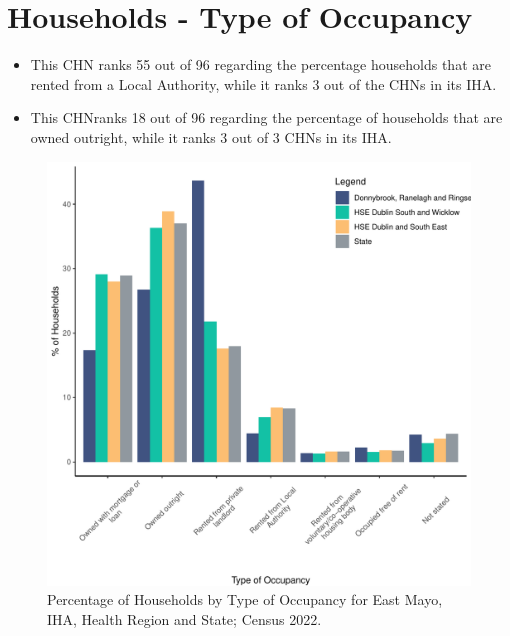 \documentclass{article}
\begin{document}
\section{Households - Type of Occupancy}\label{sect:Households}
\begin{itemize}
\item This CHN ranks  55 out of 96 regarding the percentage households that are rented from a Local Authority, while it ranks  3 out of the CHNs in its IHA. 
\item This CHNranks  18 out of 96 regarding the percentage of households that are owned outright, while it ranks   3 out of 3 CHNs in its IHA.
\end{itemize}
\begin{figure}[H]
	\centering
	\includegraphics[width = 140mm]{../figures/HouseholdsED.pdf}
	\caption{Percentage of Households by Type of Occupancy for East Mayo, IHA, Health Region and State; Census 2022.}
	\label{fig:vbnv}
	\end{figure}
\end{document}
